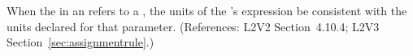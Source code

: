 When the  in an \InitialAssignment refers to a \Parameter,
the units of the \InitialAssignment's  expression  be
consistent with the units declared for that parameter.  (References: L2V2
Section~4.10.4; L2V3 Section~\ref{sec:assignmentrule}.)
